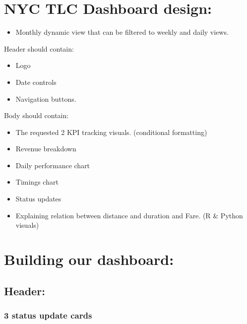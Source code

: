 \documentclass[
]{book}
\providecommand{\tightlist}{%
  \setlength{\itemsep}{0pt}\setlength{\parskip}{0pt}}
\begin{document}
\hypertarget{nyc-tlc-dashboard-design}{%
\section{NYC TLC Dashboard design:}\label{nyc-tlc-dashboard-design}}

\begin{itemize}
\tightlist
\item
  Monthly dynamic view that can be filtered to weekly and daily views.
\end{itemize}

Header should contain:

\begin{itemize}
\tightlist
\item
  Logo
\item
  Date controls\\
\item
  Navigation buttons.
\end{itemize}

Body should contain:

\begin{itemize}
\tightlist
\item
  The requested 2 KPI tracking visuals. (conditional formatting)\\
\item
  Revenue breakdown\\
\item
  Daily performance chart\\
\item
  Timings chart\\
\item
  Status updates\\
\item
  Explaining relation between distance and duration and Fare. (R \& Python visuals)
\end{itemize}

\hypertarget{building-our-dashboard}{%
\section{Building our dashboard:}\label{building-our-dashboard}}

\hypertarget{header}{%
\subsection{Header:}\label{header}}

\hypertarget{status-update-cards}{%
\subsubsection{3 status update cards}\label{status-update-cards}}
\end{document}
